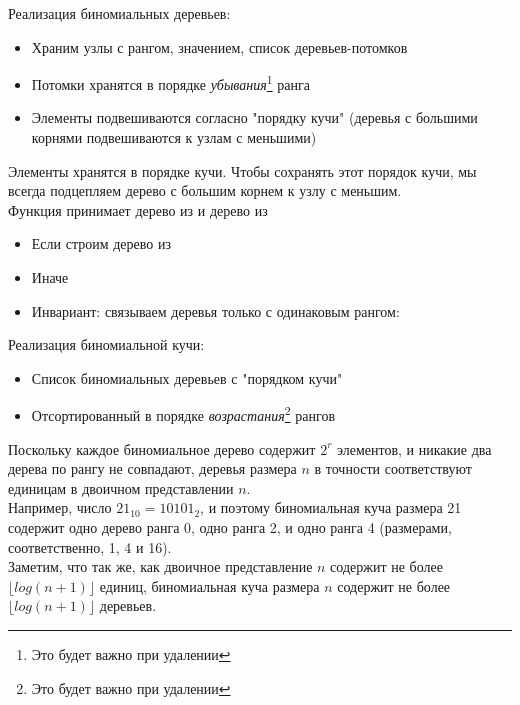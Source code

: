  
 
 
\begin{frame}[fragile]{}
Реализация биномиальных деревьев:
\begin{itemize}
\item Храним узлы с рангом, значением, список деревьев-потомков
\item Потомки хранятся в порядке \emph{убывания}\footnote{Это будет важно при удалении} ранга
\item Элементы подвешиваются согласно "порядку кучи" (деревья с большими корнями подвешиваются к узлам с меньшими)
\end{itemize}

Элементы хранятся в порядке кучи.  Чтобы сохранять этот порядок кучи, мы всегда
подцепляем дерево с большим корнем к узлу с меньшим.\\
 
Функция  принимает дерево  из  и дерево  из 
\begin{itemize}
\item Если  строим дерево из 
\item Иначе 
\item Инвариант: связываем деревья только с одинаковым рангом: 
\end{itemize}
\end{frame}
 
 
\begin{frame}[fragile]{}
Реализация биномиальной кучи:
\begin{itemize}
\item Список биномиальных деревьев с "порядком кучи"
\item Отсортированный в порядке \emph{возрастания}\footnote{Это будет важно при удалении} рангов
\end{itemize}
\vspace{1em}

Поскольку каждое биномиальное дерево содержит $2^r$ элементов, и
 никакие два дерева по рангу не совпадают, деревья размера $n$ в
 точности соответствуют единицам в двоичном представлении
 $n$.\\
 
Например, число $21_{10} = 10101_2$, и поэтому биномиальная куча размера 21 содержит одно дерево ранга 0, одно ранга 2, и одно ранга 4 (размерами, соответственно, 1, 4 и 16).\\
 
Заметим, что так же, как двоичное представление $n$ содержит не более $\lfloor log (n+1)\rfloor$ единиц, биномиальная куча размера $n$ содержит не более $\lfloor log(n+1) \rfloor$ деревьев.
\end{frame}
 
